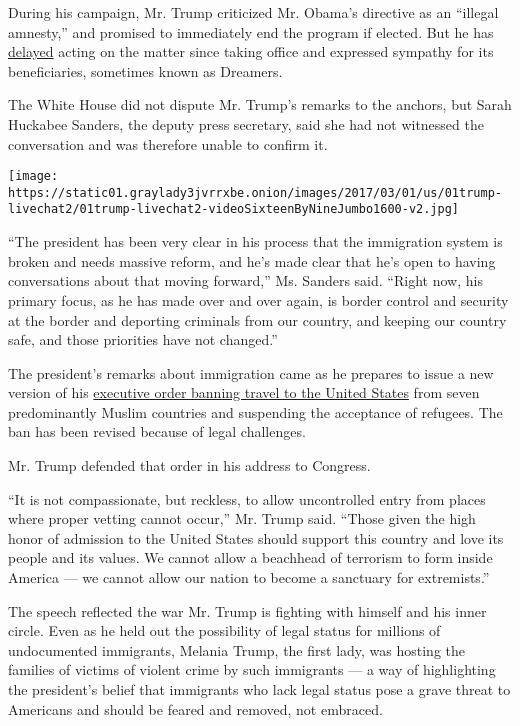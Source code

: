 During his campaign, Mr. Trump criticized Mr. Obama's directive as an
``illegal amnesty,'' and promised to immediately end the program if
elected. But he has
\href{https://www.nytimes3xbfgragh.onion/2017/02/26/us/politics/daca-dreamers-immigration-trump.html?_r=0}{delayed}
acting on the matter since taking office and expressed sympathy for its
beneficiaries, sometimes known as Dreamers.

The White House did not dispute Mr. Trump's remarks to the anchors, but
Sarah Huckabee Sanders, the deputy press secretary, said she had not
witnessed the conversation and was therefore unable to confirm it.

\texttt{[image: https://static01.graylady3jvrrxbe.onion/images/2017/03/01/us/01trump-livechat2/01trump-livechat2-videoSixteenByNineJumbo1600-v2.jpg]}

``The president has been very clear in his process that the immigration
system is broken and needs massive reform, and he's made clear that he's
open to having conversations about that moving forward,'' Ms. Sanders
said. ``Right now, his primary focus, as he has made over and over
again, is border control and security at the border and deporting
criminals from our country, and keeping our country safe, and those
priorities have not changed.''

The president's remarks about immigration came as he prepares to issue a
new version of his
\href{https://www.nytimes3xbfgragh.onion/2017/01/28/us/refugees-detained-at-us-airports-prompting-legal-challenges-to-trumps-immigration-order.html}{executive
order banning travel to the United States} from seven predominantly
Muslim countries and suspending the acceptance of refugees. The ban has
been revised because of legal challenges.

Mr. Trump defended that order in his address to Congress.

``It is not compassionate, but reckless, to allow uncontrolled entry
from places where proper vetting cannot occur,'' Mr. Trump said. ``Those
given the high honor of admission to the United States should support
this country and love its people and its values. We cannot allow a
beachhead of terrorism to form inside America --- we cannot allow our
nation to become a sanctuary for extremists.''

The speech reflected the war Mr. Trump is fighting with himself and his
inner circle. Even as he held out the possibility of legal status for
millions of undocumented immigrants, Melania Trump, the first lady, was
hosting the families of victims of violent crime by such immigrants ---
a way of highlighting the president's belief that immigrants who lack
legal status pose a grave threat to Americans and should be feared and
removed, not embraced.


